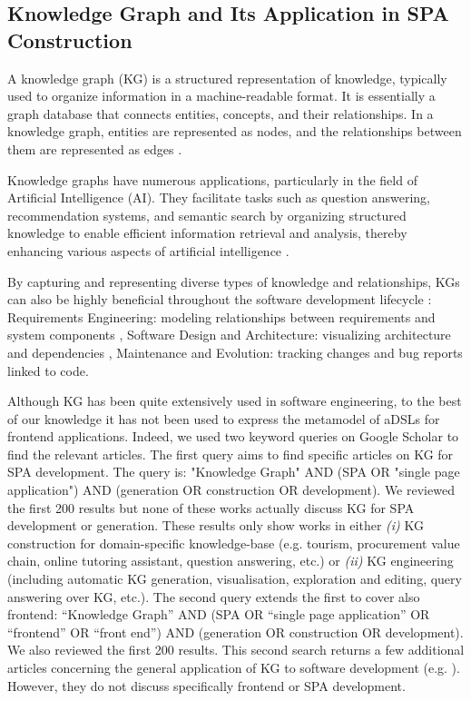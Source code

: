 \documentclass[runningheads]{llncs}
\begin{document}
\subsection{Knowledge Graph and Its Application in SPA Construction}
A knowledge graph (KG) is a structured representation of knowledge, typically used to organize information in a machine-readable format. It is essentially a graph database that connects entities, concepts, and their relationships. In a knowledge graph, entities are represented as nodes, and the relationships between them are represented as edges \cite{fensel_introduction_2020}.

Knowledge graphs have numerous applications, particularly in the field of Artificial Intelligence (AI). They facilitate tasks such as question answering, recommendation systems, and semantic search by organizing structured knowledge to enable efficient information retrieval and analysis, thereby enhancing various aspects of artificial intelligence \cite{ji_survey_2022}.

By capturing and representing diverse types of knowledge and relationships, KGs can also be highly beneficial throughout the software development lifecycle \cite{wang_application_2023}: Requirements Engineering: modeling relationships between requirements and system components \cite{Kasser_2000}, Software Design and Architecture: visualizing architecture and dependencies \cite{ali_babar_software_2009}, Maintenance and Evolution: tracking changes and bug reports linked to code.

Although KG has been quite extensively used in software engineering, to the best of our knowledge it has not been used to express the metamodel of aDSLs for frontend applications. Indeed, we used two keyword queries on Google Scholar to find the relevant articles. The first query aims to find specific articles on  KG for SPA development. The query is: "Knowledge Graph" AND (SPA OR "single page application") AND (generation OR construction OR development). We reviewed the first 200 results but none of these works actually discuss KG for SPA development or generation. These results only show works in either \textit{(i)} KG construction for domain-specific knowledge-base (e.g. tourism, procurement value chain, online tutoring assistant, question answering, etc.) or \textit{(ii)}  KG engineering (including automatic KG generation, visualisation, exploration and editing, query answering over KG, etc.). The second query extends the first to cover also frontend:  ``Knowledge Graph'' AND (SPA OR ``single page application'' OR ``frontend'' OR ``front end'') AND (generation OR construction OR development). We also reviewed the first 200 results. This second search returns a few additional articles concerning the general application of KG to software development (e.g. \cite{lin_intelligent_2017}). However, they do not discuss specifically frontend or SPA development.
\end{document}
